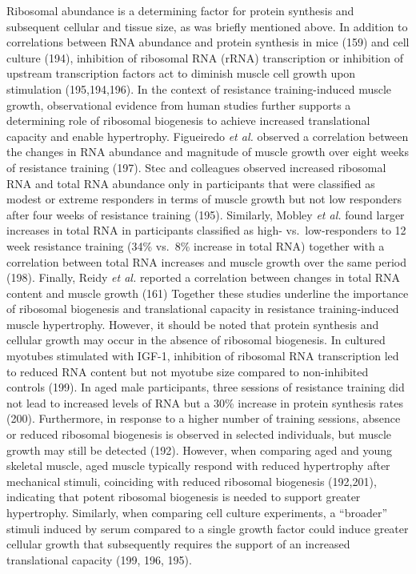 \documentclass[twoside,10pt]{gihclass} %
\begin{document}
Ribosomal abundance is a determining factor for protein synthesis and subsequent cellular and tissue size, as was briefly mentioned above.
In addition to correlations between RNA abundance and protein synthesis in mice
(159)
and cell culture
(194),
inhibition of ribosomal RNA (rRNA) transcription or inhibition of upstream transcription factors act to diminish muscle cell growth upon stimulation
(195,194,196).
In the context of resistance training-induced muscle growth, observational evidence from human studies further supports a determining role of ribosomal biogenesis to achieve increased translational capacity and enable hypertrophy.
Figueiredo \emph{et al.} observed a correlation between the changes in RNA abundance and magnitude of muscle growth over eight weeks of resistance training
(197).
Stec and colleagues observed increased ribosomal RNA and total RNA abundance only in participants that were classified as modest or extreme responders in terms of muscle growth but not low responders after four weeks of resistance training
(195).
Similarly, Mobley \emph{et al.} found larger increases in total RNA in participants classified as high- vs.~low-responders to 12 week resistance training (34\% vs.~8\% increase in total RNA) together with a correlation between total RNA increases and muscle growth over the same period
(198).
Finally, Reidy \emph{et al.} reported a correlation between changes in total RNA content and muscle growth
(161)
Together these studies underline the importance of ribosomal biogenesis and translational capacity in resistance training-induced muscle hypertrophy.
However, it should be noted that protein synthesis and cellular growth may occur in the absence of ribosomal biogenesis.
In cultured myotubes stimulated with IGF-1, inhibition of ribosomal RNA transcription led to reduced RNA content but not myotube size compared to non-inhibited controls
(199).
In aged male participants, three sessions of resistance training did not lead to increased levels of RNA but a 30\% increase in protein synthesis rates
(200).
Furthermore, in response to a higher number of training sessions, absence or reduced ribosomal biogenesis is observed in selected individuals, but muscle growth may still be detected
(192).
However, when comparing aged and young skeletal muscle, aged muscle typically respond with reduced hypertrophy after mechanical stimuli, coinciding with reduced ribosomal biogenesis
(192,201),
indicating that potent ribosomal biogenesis is needed to support greater hypertrophy.
Similarly, when comparing cell culture experiments, a ``broader'' stimuli induced by serum compared to a single growth factor could induce greater cellular growth that subsequently requires the support of an increased translational capacity
(199, 196, 195).
\end{document}
